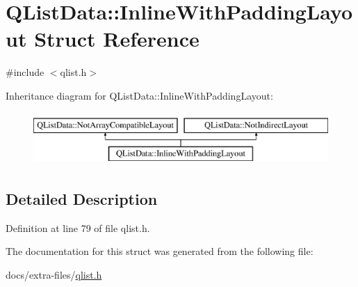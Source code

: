 \hypertarget{struct_q_list_data_1_1_inline_with_padding_layout}{}\section{Q\+List\+Data\+:\+:Inline\+With\+Padding\+Layout Struct Reference}
\label{struct_q_list_data_1_1_inline_with_padding_layout}


{\ttfamily \#include $<$qlist.\+h$>$}

Inheritance diagram for Q\+List\+Data\+:\+:Inline\+With\+Padding\+Layout\+:\begin{figure}[H]
\begin{center}
\leavevmode
\includegraphics[height=2.000000cm]{struct_q_list_data_1_1_inline_with_padding_layout}
\end{center}
\end{figure}


\subsection{Detailed Description}


Definition at line 79 of file qlist.\+h.



The documentation for this struct was generated from the following file\+:\begin{DoxyCompactItemize}
\item 
docs/extra-\/files/\hyperlink{qlist_8h}{qlist.\+h}\end{DoxyCompactItemize}
